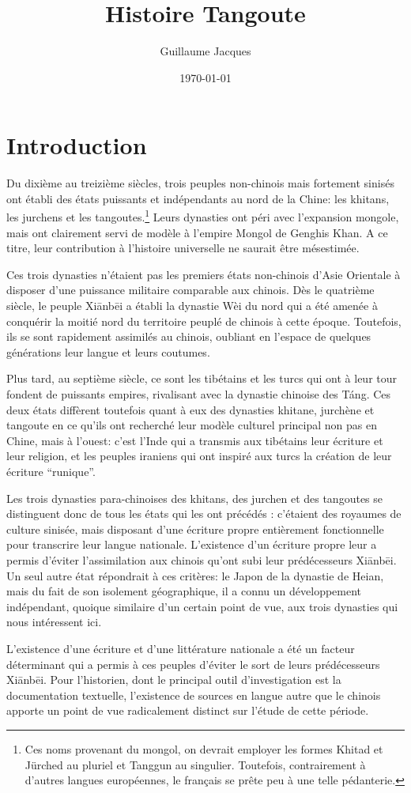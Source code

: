 \documentclass[oldfontcommands,oneside,a4paper,11pt]{memoir}
\title{Histoire Tangoute}
\author{Guillaume Jacques }
\date{\today}
\begin{document}
\chapter{Introduction}
Du dixième au treizième siècles, trois peuples non-chinois mais fortement sinisés ont établi des états puissants et indépendants au nord de la Chine: les khitans, les jurchens et les tangoutes.\footnote{Ces noms provenant du mongol, on devrait employer les formes Khitad et Jürched au pluriel et Tanggun au singulier. Toutefois, contrairement à d'autres langues européennes, le français se prête peu à une telle pédanterie.} Leurs dynasties ont péri avec l'expansion mongole, mais ont clairement servi de modèle à l'empire Mongol de Genghis Khan. A ce titre, leur contribution à l'histoire universelle ne saurait être mésestimée.

Ces trois dynasties n'étaient pas les premiers états non-chinois d'Asie Orientale à disposer d'une puissance militaire comparable aux chinois. Dès le quatrième siècle, le peuple Xiānbēi a établi la dynastie Wèi du nord qui a été amenée à conquérir la moitié nord du territoire peuplé de chinois à cette époque. Toutefois, ils se sont rapidement assimilés au chinois, oubliant en l'espace de quelques générations leur langue et leurs coutumes.

Plus tard, au septième siècle, ce sont les tibétains et les turcs qui ont à leur tour fondent de puissants empires, rivalisant avec la dynastie chinoise des Táng. Ces deux états diffèrent toutefois quant à eux des dynasties khitane, jurchène et tangoute en ce qu'ils ont recherché leur modèle culturel principal non pas en Chine, mais à l'ouest: c'est l'Inde qui a transmis aux tibétains leur écriture et leur religion, et les peuples iraniens qui ont inspiré aux turcs la création de leur écriture ``runique''.

Les trois dynasties para-chinoises des khitans, des jurchen et des tangoutes se distinguent donc de tous les états qui les ont précédés : c'étaient des royaumes de culture sinisée, mais disposant d'une écriture propre entièrement fonctionnelle pour transcrire leur langue nationale. L'existence d'un écriture propre leur a permis d'éviter l'assimilation aux chinois qu'ont subi leur prédécesseurs Xiānbēi. Un seul autre état répondrait à ces critères: le Japon de la dynastie de Heian, mais du fait de son isolement géographique, il a connu un développement indépendant, quoique similaire d'un certain point de vue, aux trois dynasties qui nous intéressent ici.

L'existence d'une écriture et d'une littérature nationale a été un facteur déterminant qui a permis à ces peuples d'éviter le sort de leurs prédécesseurs Xiānbēi. Pour l'historien, dont le principal outil d'investigation est la documentation textuelle, l'existence de sources en langue autre que le chinois apporte un point de vue radicalement distinct sur l'étude de cette période.
\end{document}
